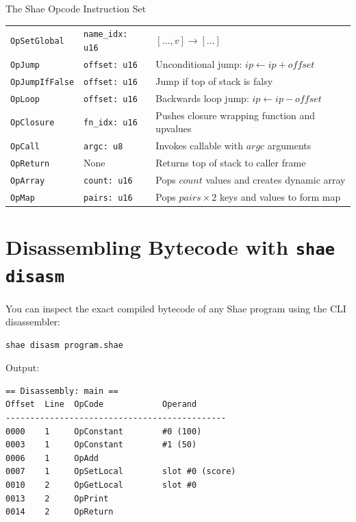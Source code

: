 \begin{deepbox}{The Shae Opcode Instruction Set}
\begin{longtable}{lll}
\texttt{OpSetGlobal} & \texttt{name\_idx: u16} & $[\dots, v] \to [\dots]$ \\
\texttt{OpJump} & \texttt{offset: u16} & Unconditional jump: $ip \gets ip + offset$ \\
\texttt{OpJumpIfFalse}& \texttt{offset: u16} & Jump if top of stack is falsy \\
\texttt{OpLoop} & \texttt{offset: u16} & Backwards loop jump: $ip \gets ip - offset$ \\
\texttt{OpClosure} & \texttt{fn\_idx: u16} & Pushes closure wrapping function and upvalues \\
\texttt{OpCall} & \texttt{argc: u8} & Invokes callable with $argc$ arguments \\
\texttt{OpReturn} & None & Returns top of stack to caller frame \\
\texttt{OpArray} & \texttt{count: u16} & Pops $count$ values and creates dynamic array \\
\texttt{OpMap} & \texttt{pairs: u16} & Pops $pairs \times 2$ keys and values to form map \\
\bottomrule
\end{longtable}
\end{deepbox}

\section{Disassembling Bytecode with \texttt{shae disasm}}

You can inspect the exact compiled bytecode of any Shae program using the CLI disassembler:
\begin{lstlisting}[language=bash]
shae disasm program.shae
\end{lstlisting}

Output:
\begin{lstlisting}[language=shaelang]
== Disassembly: main ==
Offset  Line  OpCode            Operand
---------------------------------------------
0000    1     OpConstant        #0 (100)
0003    1     OpConstant        #1 (50)
0006    1     OpAdd
0007    1     OpSetLocal        slot #0 (score)
0010    2     OpGetLocal        slot #0
0013    2     OpPrint
0014    2     OpReturn
\end{lstlisting}
